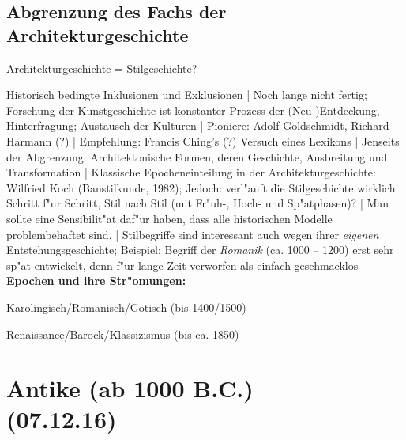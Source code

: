 \documentclass[emulatestandardclasses]{scrartcl}
\begin{document}
\subsection{Abgrenzung des Fachs der Architekturgeschichte}

Architekturgeschichte = Stilgeschichte?


Historisch bedingte Inklusionen und Exklusionen | Noch lange nicht fertig; Forschung der Kunstgeschichte ist konstanter Prozess der (Neu-)Entdeckung, Hinterfragung; Austausch der Kulturen | Pioniere: Adolf Goldschmidt, Richard Harmann (?) | Empfehlung: Francis Ching's (?) Versuch eines Lexikons | Jenseits der Abgrenzung: Architektonische Formen, deren Geschichte, Ausbreitung und Transformation | Klassische Epocheneinteilung in der Architekturgeschichte: Wilfried Koch (Baustilkunde, 1982); Jedoch: verl"auft die Stilgeschichte wirklich Schritt f"ur Schritt, Stil nach Stil (mit Fr"uh-, Hoch- und Sp"atphasen)? | Man sollte eine Sensibilit"at daf"ur haben, dass alle historischen Modelle problembehaftet sind. | Stilbegriffe sind interessant auch wegen ihrer \emph{eigenen} Entstehungsgeschichte; Beispiel: Begriff der \emph{Romanik} (ca. 1000 -- 1200) erst sehr sp"at entwickelt, denn f"ur lange Zeit verworfen als einfach geschmacklos\\

\noindent \textbf{Epochen und ihre Str"omungen:}

\begin{description}[leftmargin=!,labelwidth=\widthof{\bfseries Mittelalter}]
  \item[Antike] 
  \item[Mittelalter] Karolingisch/Romanisch/Gotisch (bis 1400/1500)
  \item[Neuzeit] Renaissance/Barock/Klassizismus (bis ca. 1850)
  \item[Moderne] 
\end{description}
%
%


\section{Antike (ab 1000 B.C.)\\(07.12.16)}
\end{document}
